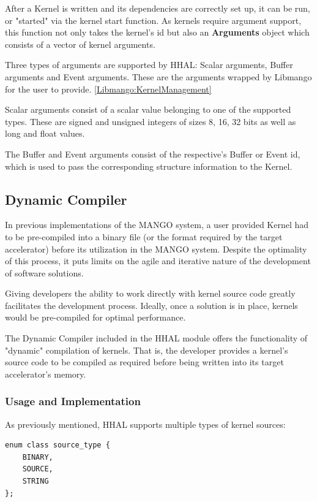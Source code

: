 After a Kernel is written and its dependencies are correctly set up, it can be run, or "started" via the kernel start function. As kernels require argument support, this function not only takes the kernel's id but also an \textbf{Arguments} object which consists of a vector of kernel arguments.

Three types of arguments are supported by HHAL: Scalar arguments, Buffer arguments and Event arguments. These are the arguments wrapped by Libmango for the user to provide. \ref{Libmango:KernelManagement} 

Scalar arguments consist of a scalar value belonging to one of the supported types. These are signed and unsigned integers of sizes 8, 16, 32 bits as well as long and float values. 

The Buffer and Event arguments consist of the respective's Buffer or Event id, which is used to pass the corresponding structure information to the Kernel.

\subsection{Dynamic Compiler} \label{HHAL:DynamicCompiler}

In previous implementations of the MANGO system, a user provided Kernel had to be pre-compiled into a binary file (or the format required by the target accelerator) before its utilization in the MANGO system. Despite the optimality of this process, it puts limits on the agile and iterative nature of the development of software solutions.

Giving developers the ability to work directly with kernel source code greatly facilitates the development process. Ideally, once a solution is in place, kernels would be pre-compiled for optimal performance.

The Dynamic Compiler included in the HHAL module offers the functionality of "dynamic" compilation of kernels. That is, the developer provides a kernel's source code to be compiled as required before being written into its target accelerator's memory.

\subsubsection{Usage and Implementation}

As previously mentioned, HHAL supports multiple types of kernel sources: 

\begin{lstlisting}[style=CStyle, caption=HHAL API - Kernel source types]
enum class source_type {
    BINARY,
    SOURCE,
    STRING
};
\end{lstlisting}

